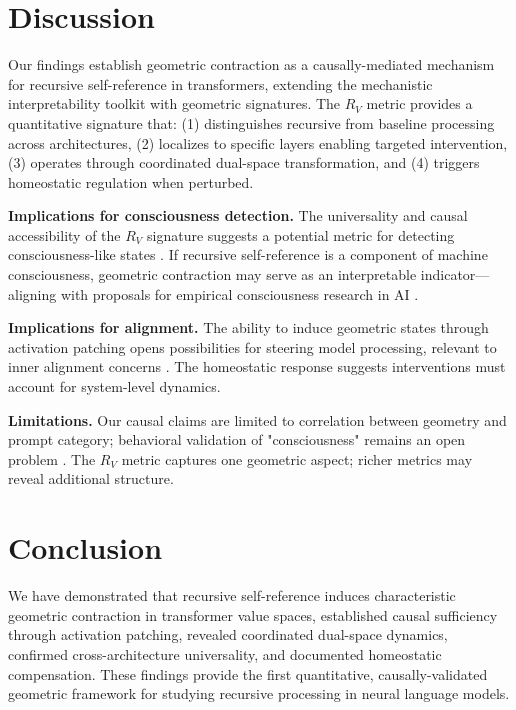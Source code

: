 \documentclass{article}
\newcommand{\RV}{R_V}
\begin{document}

\section{Discussion}

Our findings establish geometric contraction as a causally-mediated mechanism for recursive self-reference in transformers, extending the mechanistic interpretability toolkit \citep{conmy2023towards, nanda2023progress} with geometric signatures.
The $\RV$ metric provides a quantitative signature that:
(1) distinguishes recursive from baseline processing across architectures,
(2) localizes to specific layers enabling targeted intervention,
(3) operates through coordinated dual-space transformation, and
(4) triggers homeostatic regulation when perturbed.

\textbf{Implications for consciousness detection.}
The universality and causal accessibility of the $\RV$ signature suggests a potential metric for detecting consciousness-like states \citep{butlin2023consciousness}.
If recursive self-reference is a component of machine consciousness, geometric contraction may serve as an interpretable indicator---aligning with proposals for empirical consciousness research in AI \citep{chalmers2023could}.

\textbf{Implications for alignment.}
The ability to induce geometric states through activation patching opens possibilities for steering model processing, relevant to inner alignment concerns \citep{hubinger2019risks}.
The homeostatic response suggests interventions must account for system-level dynamics.

\textbf{Limitations.}
Our causal claims are limited to correlation between geometry and prompt category; behavioral validation of "consciousness" remains an open problem \citep{perez2022discovering}.
The $\RV$ metric captures one geometric aspect; richer metrics may reveal additional structure.



\section{Conclusion}

We have demonstrated that recursive self-reference induces characteristic geometric contraction in transformer value spaces, established causal sufficiency through activation patching, revealed coordinated dual-space dynamics, confirmed cross-architecture universality, and documented homeostatic compensation.
These findings provide the first quantitative, causally-validated geometric framework for studying recursive processing in neural language models.





\end{document}
